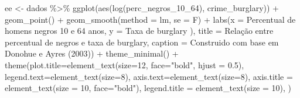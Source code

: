 \documentclass[
]{article}
\newenvironment{Shaded}{\begin{snugshade}}{\end{snugshade}}
\newcommand{\AttributeTok}[1]{\textcolor[rgb]{0.77,0.63,0.00}{#1}}
\newcommand{\DecValTok}[1]{\textcolor[rgb]{0.00,0.00,0.81}{#1}}
\newcommand{\FloatTok}[1]{\textcolor[rgb]{0.00,0.00,0.81}{#1}}
\newcommand{\FunctionTok}[1]{\textcolor[rgb]{0.00,0.00,0.00}{#1}}
\newcommand{\NormalTok}[1]{#1}
\newcommand{\OtherTok}[1]{\textcolor[rgb]{0.56,0.35,0.01}{#1}}
\newcommand{\SpecialCharTok}[1]{\textcolor[rgb]{0.00,0.00,0.00}{#1}}
\newcommand{\StringTok}[1]{\textcolor[rgb]{0.31,0.60,0.02}{#1}}
\begin{document}
\begin{Shaded}
\begin{Highlighting}[]
\NormalTok{ee }\OtherTok{\textless{}{-}}\NormalTok{ dados }\SpecialCharTok{\%\textgreater{}\%} 
  \FunctionTok{ggplot}\NormalTok{(}\FunctionTok{aes}\NormalTok{(}\FunctionTok{log}\NormalTok{(perc\_negros\_10\_64), crime\_burglary)) }\SpecialCharTok{+}
  \FunctionTok{geom\_point}\NormalTok{() }\SpecialCharTok{+} 
  \FunctionTok{geom\_smooth}\NormalTok{(}\AttributeTok{method =} \StringTok{\textquotesingle{}lm\textquotesingle{}}\NormalTok{, }\AttributeTok{se =}\NormalTok{ F) }\SpecialCharTok{+}
  \FunctionTok{labs}\NormalTok{(}\AttributeTok{x =} \StringTok{\textquotesingle{}Percentual de homens negros 10 e 64 anos\textquotesingle{}}\NormalTok{,}
       \AttributeTok{y =} \StringTok{\textquotesingle{}Taxa de burglary )\textquotesingle{}}\NormalTok{,}
       \AttributeTok{title =} \StringTok{\textquotesingle{}Relação entre percentual de negros e taxa de burglary\textquotesingle{}}\NormalTok{,}
       \AttributeTok{caption =} \StringTok{\textquotesingle{}Construido com base em Donohue e Ayres (2003)\textquotesingle{}}\NormalTok{) }\SpecialCharTok{+} 
  \FunctionTok{theme\_minimal}\NormalTok{() }\SpecialCharTok{+}
  \FunctionTok{theme}\NormalTok{(}\AttributeTok{plot.title=}\FunctionTok{element\_text}\NormalTok{(}\AttributeTok{size=}\DecValTok{12}\NormalTok{, }\AttributeTok{face=}\StringTok{"bold"}\NormalTok{, }\AttributeTok{hjust =} \FloatTok{0.5}\NormalTok{),}
        \AttributeTok{legend.text=}\FunctionTok{element\_text}\NormalTok{(}\AttributeTok{size=}\DecValTok{8}\NormalTok{),}
        \AttributeTok{axis.text=}\FunctionTok{element\_text}\NormalTok{(}\AttributeTok{size=}\DecValTok{8}\NormalTok{),}
        \AttributeTok{axis.title =} \FunctionTok{element\_text}\NormalTok{(}\AttributeTok{size =} \DecValTok{10}\NormalTok{, }\AttributeTok{face=}\StringTok{"bold"}\NormalTok{),}
        \AttributeTok{legend.title =} \FunctionTok{element\_text}\NormalTok{(}\AttributeTok{size =} \DecValTok{10}\NormalTok{),}
\NormalTok{  )}


\end{Highlighting}
\end{Shaded}
\end{document}
